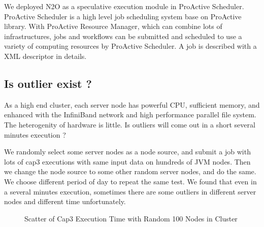  We deployed N2O as a speculative execution module in ProActive Scheduler. ProActive Scheduler is a high level job scheduling system base on ProActive library. With ProActive Resource Manager, which can combine lots of infrastructures, jobs and workflows can be submitted and scheduled to use a variety of computing resources by ProActive Scheduler. A job is described with a XML descriptor in details.

\subsection{Is outlier exist ?}

As a high end cluster, each server node has powerful CPU, sufficient memory, and enhanced with the InfiniBand network and high performance parallel file system. The heterogenity of hardware is little. Is outliers will come out in a short several minutes execution ?

We randomly select some server nodes as a node source, and submit a job with lots of cap3 executions with same input data on hundreds of JVM nodes. Then we change the node source to some other random server nodes, and do the same. We choose different period of day to repeat the same test. We found that even in a several minutes execution, sometimes there are some outliers in different server nodes and different time unfortunately.

\begin{figure}
\centering
{}
\caption{Scatter of Cap3 Execution Time with Random 100 Nodes in Cluster}
\label{figure:outlier}
\end{figure}

